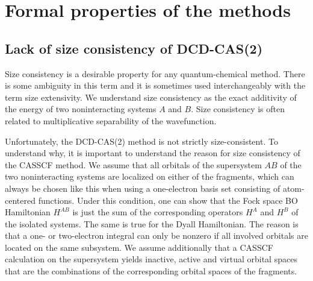 \section{Formal properties of the methods}

\subsection{Lack of size consistency of DCD-CAS(2)}
\label{Sec:DCD_SC_proof}
Size consistency is a desirable property for any quantum-chemical method. There is some ambiguity in this term and it is sometimes used interchangeably with the term size extensivity.\cite{BartlP_1978_561, NooijSM_2005_2277} We understand size consistency as the exact additivity of the energy of two noninteracting systems $A$ and $B$. Size consistency is often related to multiplicative separability of the wavefunction.\cite{Mayer_2003_}

Unfortunately, the DCD-CAS(2) method is not strictly size-consistent. To understand why, it is important to understand the reason for size consistency of the CASSCF method.
We assume that all orbitals of the supersystem $AB$ of the two noninteracting systems are localized on either of the fragments, which can always be chosen like this when using a one-electron basis set consisting of atom-centered functions. Under this condition, one can show that the Fock space BO Hamiltonian ${H^{AB}}$ is just the sum of the corresponding operators ${H^A}$ and ${H^B}$ of the isolated systems.\cite{HelgaJO_2000_} The same is true for the Dyall Hamiltonian.\cite{AngelCELM_2001_10252} The reason is that a one- or two-electron integral can only be nonzero if all involved orbitals are located on the same subsystem. We assume additionally that a CASSCF calculation on the supersystem yields inactive, active and virtual orbital spaces that are the combinations of the corresponding orbital spaces of the fragments. 

